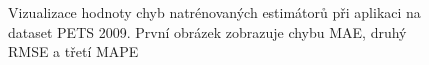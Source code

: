\begin{figure}[h!]
	\centering
	\caption{Vizualizace hodnoty chyb natrénovaných estimátorů při aplikaci na dataset PETS 2009. První obrázek zobrazuje chybu MAE, druhý RMSE a třetí MAPE}
	\label{fig:heatmaps}
\end{figure}




\endinput